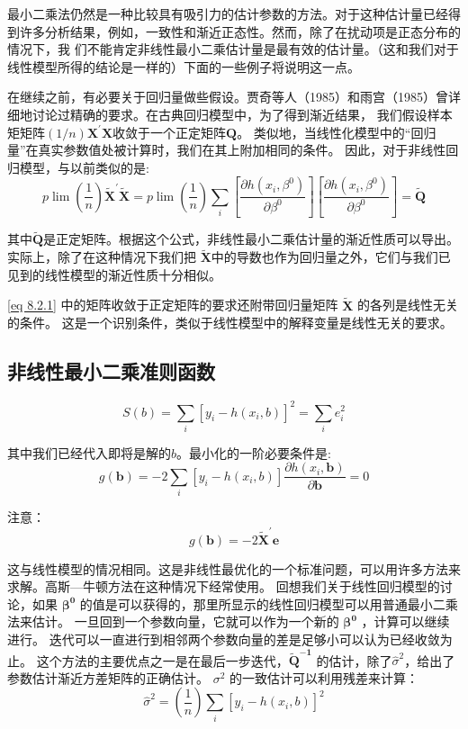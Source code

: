 最小二乘法仍然是一种比较具有吸引力的估计参数的方法。对于这种估计量已经得到许多分析结果，例如，一致性和渐近正态性。然而，除了在扰动项是正态分布的情况下，我
们不能肯定非线性最小二乘估计量是最有效的估计量。（这和我们对于线性模型所得的结论是一样的）下面的一些例子将说明这一点。

在继续之前，有必要关于回归量做些假设。贾奇等人（1985）和雨宫（1985）曾详细地讨论过精确的要求。在古典回归模型中，为了得到渐近结果，
我们假设样本矩矩阵$ (1/n) \boldsymbol{X^{\prime}X} $收敛于一个正定矩阵$  \boldsymbol{Q} $。
类似地，当线性化模型中的“回归量”在真实参数值处被计算时，我们在其上附加相同的条件。
因此，对于非线性回归模型，与以前类似的是:
\begin{equation}
     p \lim \left(\frac{1}{n}\right)  \boldsymbol{ {\tilde{X}^{\prime}} \tilde{X} }
     =p \lim \left(\frac{1}{n}\right) \sum_{i}\left[\frac{\partial h\left(x_{i}, \beta^{0}\right)}{\partial \beta^{0}}\right]
     \left[\frac{\partial h\left(x_{i}, \beta^{0}\right)}{\partial \beta^{0}}\right]=  \boldsymbol{\widetilde{Q}} 
     \label{eq 8.2.1}
\end{equation}

其中$  \boldsymbol{\tilde{ Q }} $是正定矩阵。根据这个公式，非线性最小二乘估计量的渐近性质可以导出。
实际上，除了在这种情况下我们把 $  \boldsymbol{\tilde{ X }} $中的导数也作为回归量之外，它们与我们已见到的线性模型的渐近性质十分相似。

 \eqref{eq 8.2.1} 中的矩阵收敛于正定矩阵的要求还附带回归量矩阵 $  \boldsymbol{\tilde{ X }} $ 的各列是线性无关的条件。
 这是一个识别条件，类似于线性模型中的解释变量是线性无关的要求。

 \subsection{非线性最小二乘准则函数}
$$ S(b)=\sum_{i}\left[y_{i}-h\left(x_{i}, b\right)\right]^{2}=\sum_{i} e_{i}^{2} $$

其中我们已经代入即将是解的$ b $。最小化的一阶必要条件是:
$$ g( \boldsymbol{b})=-2 \sum_{i}\left[y_{i}-h\left(x_{i}, b\right)\right] 
        \frac{\partial h\left(x_{i},  \boldsymbol{b}\right)}{\partial  \boldsymbol{b}}=0 $$

注意：$$ g( \boldsymbol{b})=-2  \boldsymbol{\tilde{X}^{\prime} e} $$

这与线性模型的情况相同。这是非线性最优化的一个标准问题，可以用许多方法来求解。高斯—牛顿方法在这种情况下经常使用。
回想我们关于线性回归模型的讨论，如果 $  \boldsymbol{\beta^{0}} $ 的值是可以获得的，那里所显示的线性回归模型可以用普通最小二乘法来估计。
一旦回到一个参数向量，它就可以作为一个新的  $  \boldsymbol{\beta^{0}} $ ，计算可以继续进行。
迭代可以一直进行到相邻两个参数向量的差是足够小可以认为已经收敛为止。
这个方法的主要优点之一是在最后一步迭代，$  \boldsymbol{{\tilde{ Q }}^{-1}} $ 的估计，除了$ \hat{\sigma}^{2} $，给出了参数估计渐近方差矩阵的正确估计。
$ {\sigma}^{2} $ 的一致估计可以利用残差来计算：
\begin{equation}
    \hat{\sigma}^{2}=\left(\frac{1}{n}\right) \sum_{i}\left[y_{i}-h\left(x_{i}, b\right)\right]^{2}
\end{equation}

